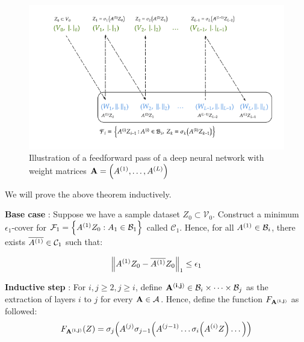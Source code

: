 \begin{proof*}
    \begin{figure}[!ht]
        \centering
        \includegraphics[width=\textwidth]{figures/neural-network.png}
        \caption{Illustration of a feedforward pass of a deep neural network with weight matrices ${\bf A}=\Big( A^{(1)}, \dots, A^{(L)} \Big)$}
        \label{fig:neural-network-illustration}
    \end{figure}

    \noindent We will prove the above theorem inductively. 
    
    \noindent\newline\textbf{Base case} : Suppose we have a sample dataset $Z_0\subset\mathcal{V}_0$. Construct a minimum $\epsilon_1$-cover for $\mathcal{F}_1 = \Big\{ A^{(1)}Z_0 : A_1 \in \mathcal{B}_1 \Big\}$ called $\mathcal{C}_1$. Hence, for all $A^{(1)}\in\mathcal{B}_i$, there exists $\overline{A^{(1)}}\in\mathcal{C}_1$ such that:

    \begin{align*}
        \Big\|A^{(1)}Z_0 - \overline{A^{(1)}}Z_0\Big\|_1 \le \epsilon_1
    \end{align*} 
    
    
    \noindent \textbf{Inductive step} : For $i, j \ge 2, j \ge i$, define ${\bf A^{(i, j)}}\in\mathcal{B}_i\times\dots\times\mathcal{B}_j$ as the extraction of layers $i$ to $j$ for every ${\bf A}\in\mathcal{A}$. Hence, define the function $F_{\bf A^{(i, j)}}$ as followed:
    \begin{align*}
        F_{\bf A^{(i, j)}}(Z) = \sigma_j\Big( 
            A^{(j)}\sigma_{j-1}\Big( 
                A^{(j-1)}\dots\sigma_i\Big( A^{(i)}Z \Big)\dots
             \Big)
         \Big)
    \end{align*} 
    

\end{proof*}
